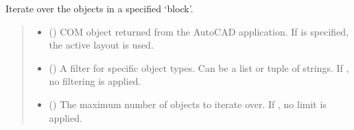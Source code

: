 \documentclass[a4paper,10pt,english]{sphinxmanual}
\begin{document}
\begin{fulllineitems}

\begin{fulllineitems}
\label{\detokenize{API:pyacad.Autocad.Autocad.iter_objects}}
\pysigstartsignatures
{}
\pysigstopsignatures
\sphinxAtStartPar
Iterate over the objects in a specified ‘block’.
\begin{quote}\begin{description}
\begin{itemize}
\item {} 
\sphinxAtStartPar
{} (\sphinxstyleliteralemphasis{\sphinxupquote{, }}) \textendash{} COM object returned from the AutoCAD application. If  is specified,
the active layout is used.

\item {} 
\sphinxAtStartPar
{} (\sphinxstyleliteralemphasis{\sphinxupquote{, }}\sphinxstyleliteralemphasis{\sphinxupquote{, }}) \textendash{} A filter for specific object types. Can be a list or tuple of strings.
If , no filtering is applied.

\item {} 
\sphinxAtStartPar
{} (\sphinxstyleliteralemphasis{\sphinxupquote{, }}) \textendash{} The maximum number of objects to iterate over. If , no limit is applied.

\end{itemize}


\end{description}
\end{quote}
\end{fulllineitems}
\end{fulllineitems}
\end{document}
